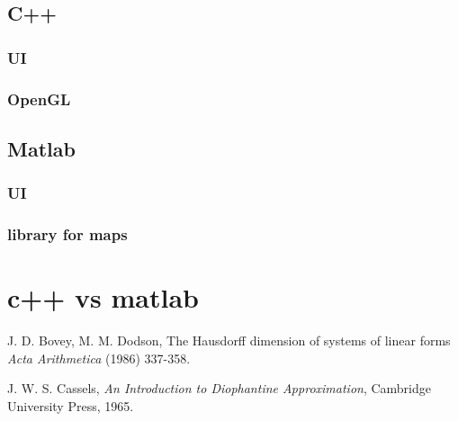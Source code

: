 \documentclass[reqno,openany,12pt]{amsbook}
\theoremstyle{definition}
\theoremstyle{remark}
\begin{document}
\section{C++}
\subsection{UI}
\subsection{OpenGL}
\section{Matlab}
\subsection{UI}
\subsection{library for maps}
\chapter{c++ vs matlab}




\begin{thebibliography}{99}

J. D. Bovey, M. M. Dodson,
The Hausdorff dimension of systems of linear forms
{\em Acta Arithmetica}
(1986) 337-358.

J. W. S. Cassels,
{\em An Introduction to Diophantine Approximation},
Cambridge University Press, 1965.



\end{thebibliography}
\end{document}

